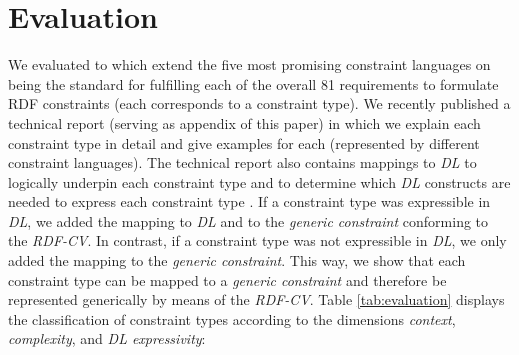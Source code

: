 \documentclass[a4paper,fontsize=11pt]{scrartcl}
\begin{document}
\section{Evaluation}
\label{sec:evaluation}

We evaluated to which extend the five most promising constraint languages on being the standard for fulfilling each of the overall 81 requirements to formulate RDF constraints (each corresponds to a constraint type).
We recently published a technical report (serving as appendix of this paper) in which we explain each constraint type in detail and give examples for each (represented by different constraint languages).
The technical report also contains mappings to \emph{DL} to logically underpin each constraint type and to determine which \emph{DL} constructs are needed to express each constraint type \cite{BoschNolleAcarEckert2015}.
If a constraint type was expressible in \emph{DL}, we added the mapping to \emph{DL} and to the \emph{generic constraint} conforming to the \emph{RDF-CV}.
In contrast, if a constraint type was not expressible in \emph{DL}, we only added the mapping to the \emph{generic constraint}.
This way, we show that each constraint type can be mapped to a \emph{generic constraint} and therefore be represented generically by means of the \emph{RDF-CV}.
Table \ref{tab:evaluation} displays the classification of constraint types according to the dimensions \emph{context}, \emph{complexity}, and \emph{DL expressivity}:

\end{document}
